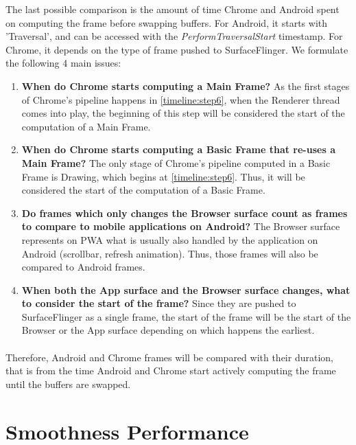 \documentclass{kththesis}
\begin{document}
The last possible comparison is the amount of time Chrome and Android spent on computing the frame before swapping buffers. For Android, it starts with 'Traversal', and can be accessed with the \textit{PerformTraversalStart} timestamp. For Chrome, it depends on the type of frame pushed to SurfaceFlinger. We formulate the following 4 main issues:
\begin{enumerate}
    \item \textbf{When do Chrome starts computing a Main Frame?} \newline
    As the first stages of Chrome's pipeline happens in \ref{timeline:step6}, when the Renderer thread comes into play, the beginning of this step will be considered the start of the computation of a Main Frame.
    \item \textbf{When do Chrome starts computing a Basic Frame that re-uses a Main Frame?} \newline
    The only stage of Chrome's pipeline computed in a Basic Frame is Drawing, which begins at \ref{timeline:step6}. Thus, it will be considered the start of the computation of a Basic Frame.
    \item \textbf{Do frames which only changes the Browser surface count as frames to compare to mobile applications on Android?} \newline
    The Browser surface represents on PWA what is usually also handled by the application on Android (scrollbar, refresh animation). Thus, those frames will also be compared to Android frames. 
    \item \textbf{When both the App surface and the Browser surface changes, what to consider the start of the frame?} \newline
    Since they are pushed to SurfaceFlinger as a single frame, the start of the frame will be the start of the Browser or the App surface depending on which happens the earliest. 
\end{enumerate}

\paragraph{}
Therefore, Android and Chrome frames will be compared with their duration, that is from the time Android and Chrome start actively computing the frame until the buffers are swapped. 

\section{Smoothness Performance}
\end{document}
